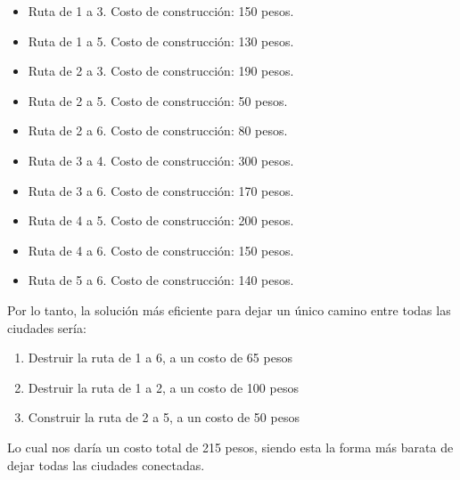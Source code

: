 \begin{itemize}
\item Ruta de 1 a 3. Costo de construcción: 150 pesos.
\item Ruta de 1 a 5. Costo de construcción: 130 pesos.
\item Ruta de 2 a 3. Costo de construcción: 190 pesos.
\item Ruta de 2 a 5. Costo de construcción: 50 pesos.
\item Ruta de 2 a 6. Costo de construcción: 80 pesos.
\item Ruta de 3 a 4. Costo de construcción: 300 pesos.
\item Ruta de 3 a 6. Costo de construcción: 170 pesos.
\item Ruta de 4 a 5. Costo de construcción: 200 pesos.
\item Ruta de 4 a 6. Costo de construcción: 150 pesos.
\item Ruta de 5 a 6. Costo de construcción: 140 pesos.
\end{itemize}

Por lo tanto, la solución más eficiente para dejar un único camino entre todas las ciudades sería:

\begin{enumerate}
\item Destruir la ruta de 1 a 6, a un costo de 65 pesos
\item Destruir la ruta de 1 a 2, a un costo de 100 pesos
\item Construir la ruta de 2 a 5, a un costo de 50 pesos
\end{enumerate}

Lo cual nos daría un costo total de 215 pesos, siendo esta la forma más barata de dejar todas las ciudades conectadas.
\\
